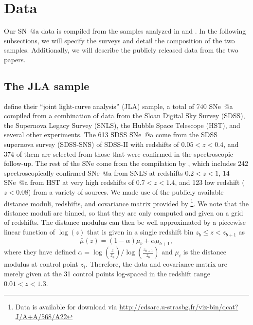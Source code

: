 \documentclass[12pt,a4paper]{article}
\makeatletter
\newcommand*{\rom}[1]{\expandafter\@slowromancap\romannumeral #1@}
\newcommand{\sne}{\mbox{SNe}}
\newcommand{\sna}{\mbox{SN \rom{1}a}}
\newcommand{\snea}{\mbox{SNe \rom{1}a}}
\makeatother
\begin{document}
\section{Data}
\label{sec:data}
Our {\sna} data is compiled from the samples analyzed in 
\citet{betoule2014} and \citet{rest2014}. In the following subsections, 
we will specify the surveys and detail the composition of the two samples. 
Additionally, we will describe the publicly released data from the two papers.

\subsection{The JLA sample}
\label{sec:betoule}
\citet{betoule2014} define their ``joint light-curve analysis'' (JLA) 
sample, a total of 740 \snea{} compiled from a combination of 
data from the Sloan Digital Sky 
Survey (SDSS), the Supernova Legacy Survey (SNLS), the Hubble Space 
Telescope (HST), and several other experiments. The 613 SDSS \snea{} 
come from the SDSS supernova survey (SDSS-SNS) of SDSS-II \citep{sako2014} 
with redshifts of $0.05 < z < 0.4$, and 374 of them are selected from those 
that were confirmed in the spectroscopic follow-up. The rest of the 
\sne{} come from the compilation by \citet{conley2011}, which includes 
242 spectroscopically confirmed \snea{} from SNLS at redshifts $0.2 < z < 1$, 
14 \snea{} from HST at very high redshifts of $0.7 < z < 1.4$, and 123 
low redshift ($z < 0.08$) from a variety of sources. We made use of the 
publicly available distance moduli, redshifts, and covariance 
matrix provided by \citet{betoule2014}\footnote{Data is available 
for download via 
\url{http://cdsarc.u-strasbg.fr/viz-bin/qcat?J/A+A/568/A22}}. 
We note that the distance moduli are binned, so that they are only computed and 
given on a grid of redshifts. The distance modulus can then be well 
approximated by a piecewise linear function of $\log(z)$ that is given 
in a single redshift bin $z_b \le z < z_{b+1}$ as 
\citep[see][Appendix E.1]{betoule2014}
%
\begin{equation}
\label{eq:binnedMu}
\bar{\mu}(z) = (1 - \alpha) \mu_b + \alpha \mu_{b+1},
\end{equation}
%
where they have defined 
$\alpha = \log\left(\frac{z}{z_b}\right)/\log\left(\frac{z_{b+1}}{z_b}\right)$ 
and $\mu_i$ is the distance modulus at control point $z_i$. 
Therefore, the data and covariance matrix are merely given at the 
31 control points log-spaced in the redshift range $0.01 < z < 1.3$.
\end{document}
